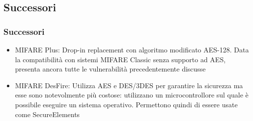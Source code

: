\subsection{Successori}
\begin{frame}
    \frametitle{Successori}
    \begin{itemize}
        \item <1-> MIFARE Plus: Drop-in replacement con algoritmo modificato AES-128. Data la compatibilità con sistemi MIFARE Classic senza supporto ad AES, presenta ancora tutte le vulnerabilità precedentemente discusse
        \item <2-> MIFARE DesFire: Utilizza AES e DES/3DES per garantire la sicurezza ma esse sono notevolmente più costose: utilizzano un microcontrollore sul quale è possibile eseguire un sistema operativo. Permettono quindi di essere usate come SecureElements
    \end{itemize}
\end{frame}